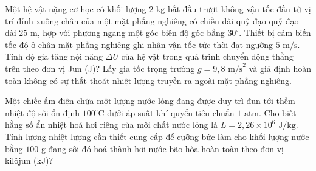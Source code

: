 \begin{ex}%
	Một hệ vật nặng cơ học có khối lượng $2\text{ kg}$ bắt đầu trượt không vận tốc đầu từ vị trí đỉnh xuống chân của một mặt phẳng nghiêng có chiều dài quỹ đạo quỹ đạo dài $25\text{ m}$, hợp với phương ngang một góc biên độ góc bằng $30^\circ$. Thiết bị cảm biến tốc độ ở chân mặt phẳng nghiêng ghi nhận vận tốc tức thời đạt ngưỡng $5\text{ m/s}$. Tính độ gia tăng nội năng $\Delta U$ của hệ vật trong quá trình chuyển động thẳng trên theo đơn vị Jun (J)? Lấy gia tốc trọng trường $g = 9,8\text{ m/s}^2$ và giả định hoàn toàn không có sự thất thoát nhiệt lượng truyền ra ngoài mặt phẳng nghiêng.
\end{ex}

\begin{ex}%
	Một chiếc ấm điện chứa một lượng nước lỏng đang được duy trì đun tới thềm nhiệt độ sôi ổn định $100^\circ\text{C}$ dưới áp suất khí quyển tiêu chuẩn $1\text{ atm}$. Cho biết hằng số ẩn nhiệt hoá hơi riêng của môi chất nước lỏng là $L = 2,26 \times 10^{6}\text{ J/kg}$. Tính lượng nhiệt lượng cần thiết cung cấp để cưỡng bức làm cho khối lượng nước bằng $100\text{ g}$ đang sôi đó hoá thành hơi nước bão hòa hoàn toàn theo đơn vị kilôjun (kJ)?
\end{ex}

